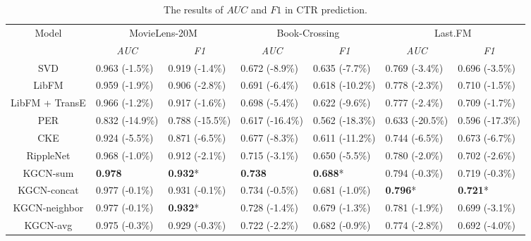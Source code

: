 \documentclass[sigconf]{acmart}
\begin{document}
	\begin{table*}[t]
    	\centering
    	\setlength{\tabcolsep}{8pt}
    	\caption{The results of $AUC$ and $F1$ in CTR prediction.}
    	\begin{tabular}{c|llllll}
    		\hline
    		\multirow{2}{*}{Model} & \multicolumn{2}{c}{MovieLens-20M} & \multicolumn{2}{c}{Book-Crossing} & \multicolumn{2}{c}{Last.FM} \\
            & \multicolumn{1}{c}{\textit{AUC}} & \multicolumn{1}{c}{\textit{F1}} & \multicolumn{1}{c}{\textit{AUC}} & \multicolumn{1}{c}{\textit{F1}} & \multicolumn{1}{c}{\textit{AUC}} & \multicolumn{1}{c}{\textit{F1}} \\
            \hline
            SVD & 0.963 (-1.5\%) & 0.919 (-1.4\%) & 0.672 (-8.9\%) & 0.635 (-7.7\%) & 0.769 (-3.4\%) & 0.696 (-3.5\%) \\
            LibFM & 0.959 (-1.9\%) & 0.906 (-2.8\%) & 0.691 (-6.4\%) & 0.618 (-10.2\%) & 0.778 (-2.3\%) & 0.710 (-1.5\%) \\
            LibFM + TransE & 0.966 (-1.2\%) & 0.917 (-1.6\%) & 0.698 (-5.4\%) & 0.622 (-9.6\%) & 0.777 (-2.4\%) & 0.709 (-1.7\%) \\
            PER & 0.832 (-14.9\%) & 0.788 (-15.5\%) & 0.617 (-16.4\%) & 0.562 (-18.3\%) & 0.633 (-20.5\%) & 0.596 (-17.3\%) \\
            CKE & 0.924 (-5.5\%) & 0.871 (-6.5\%) & 0.677 (-8.3\%) & 0.611 (-11.2\%) & 0.744 (-6.5\%) & 0.673 (-6.7\%) \\
            RippleNet & 0.968 (-1.0\%) & 0.912 (-2.1\%) & 0.715 (-3.1\%) & 0.650 (-5.5\%) & 0.780 (-2.0\%) & 0.702 (-2.6\%) \\
            \hline
            KGCN-sum & \textbf{0.978} & \textbf{0.932}* & \textbf{0.738} & \textbf{0.688}* & 0.794 (-0.3\%) & 0.719 (-0.3\%) \\
            KGCN-concat & 0.977 (-0.1\%) & 0.931 (-0.1\%) & 0.734 (-0.5\%) & 0.681 (-1.0\%) & \textbf{0.796}* & \textbf{0.721}* \\
            KGCN-neighbor & 0.977 (-0.1\%) & \textbf{0.932}* & 0.728 (-1.4\%) & 0.679 (-1.3\%) & 0.781 (-1.9\%) & 0.699 (-3.1\%) \\
            \hline
            KGCN-avg & 0.975 (-0.3\%) & 0.929 (-0.3\%) & 0.722 (-2.2\%) & 0.682 (-0.9\%) & 0.774 (-2.8\%) & 0.692 (-4.0\%) \\
            \hline
		\end{tabular}
		\label{table:ctr}
		\footnotesize {}
	\end{table*}
		
\end{document}
